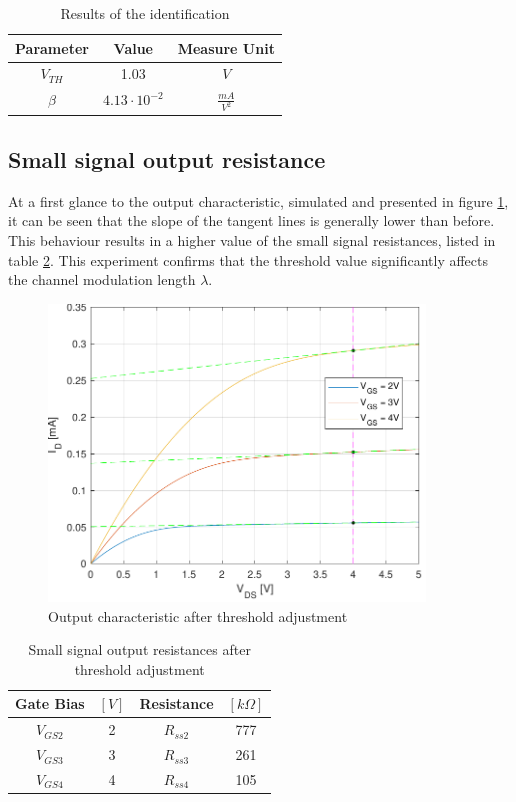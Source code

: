 \documentclass[11pt,a4paper]{article}
\begin{document}
		\begin{table}
			\caption{Results of the identification}
			\centering
			\begin{tabular}[H]{|| c | c | c ||}
				\hline
				Parameter & Value & Measure Unit \\ [0.5ex] 
				\hline\hline
				$V_{TH}$ & 1.03 & $V$\\
				\hline
				$\beta$ & $4.13\cdot 10^{-2}$ & $\frac{mA}{V^2}$\\
				\hline			
			\end{tabular}
			\label{identification_results2}
		\end{table}
	\subsection{Small signal output resistance}
	At a first glance to the output characteristic, simulated and presented in figure \ref*{outputcurve2}, it can be seen that the slope of the tangent lines is generally lower than before. This behaviour results in a higher value of the small signal resistances, listed in table \ref*{resistances_adj}. This experiment confirms that the threshold value significantly affects the channel modulation length $\lambda$.
		\begin{figure}
			\centering
			\includegraphics[width=100mm]{output_curves_adj}
			\caption{Output characteristic after threshold adjustment}
			\label{outputcurve2}
		\end{figure}
		\begin{table}
			\caption{Small signal output resistances after threshold adjustment}
			\centering
			\begin{tabular}{|| c | c | c | c ||}
				\hline
				Gate Bias & $[V]$ & Resistance & $[k\Omega]$ \\ [0.5ex] 
				\hline\hline
				$V_{GS2}$ & 2 & $R_{ss2}$& 777\\
				\hline
				$V_{GS3}$ & 3 & $R_{ss3}$& 261\\
				\hline
				$V_{GS4}$ & 4 & $R_{ss4}$& 105\\
				\hline			
			\end{tabular}
			\label{resistances_adj}
		\end{table}
\end{document}
